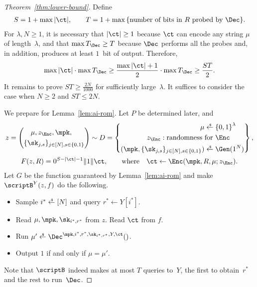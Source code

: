 \begin{proof}
[%
Theorem~\ref{thm:lower-bound}]
Define
\begin{align*}
S=1+\max{|\ct|},\qquad
T=1+\max{\{\textup{number of bits in $R$ probed by $\Dec$}\}}.
\end{align*}
For ${\lambda,N\geq 1}$, it is necessary
that ${|\ct|\geq 1}$ because $\ct$ can encode any string $\mu$ of length~$\lambda$, and
that ${\max{T_\Dec}\geq T}$ because $\Dec$ performs all the probes and, in addition, produces at least $1$~bit of output.
Therefore,
\begin{align*}
\max{|\ct|}\cdot\max{T_\Dec}
\geq\frac{\max{|\ct|}+1}{2}\cdot\max{T_\Dec}
\geq\frac{ST}{2}.
\end{align*}
It remains to prove ${ST\geq\frac{2N}{1000}}$ for sufficiently large~$\lambda$.
It suffices to consider the case when ${N\geq 2}$ and ${ST\leq 2N}$.

We prepare for Lemma~\ref{lem:ai-rom}.
Let $P$ be determined later, and
\begin{align*}
z&{}=\left(\begin{aligned}
&\quad\WideNarrow{}{\ \,}\mu,z_\Enc,\mpk,\\
&\{\sk_{j,s}\}_{j\in[N],s\in\bit}
\end{aligned}\right)\sim D=
\left\{\begin{aligned}
\mu\draws{}&\bit^\lambda\\
z_\Enc:\textup{randomness for }&\Enc\\
(\mpk,\{\sk_{j,s}\}_{j\in[N],s\in\bit})\draws{}&\Gen(1^N)
\end{aligned}\right\},\\
\rule[1em]{0pt}{0pt}
F(z,R)
\hspace*{-5em}&\hspace*{5em}
{}=0^{S-|\ct|-1}\concat 1\concat\ct,\qquad
\textup{where}\quad
\ct\gets\Enc(\mpk,R,\mu;z_\Enc).
\end{align*}
Let $G$ be the function guaranteed by Lemma~\ref{lem:ai-rom} and make
$\scriptB^Y(z,f)$ do the following.
\begin{itemize}
\item Sample ${i^\ast\draws[N]}$ and query ${r^\ast\gets Y[i^\ast]}$.
\item Read $\mu,\mpk,\sk_{i^\ast,r^\ast}$ from $z$. Read $\ct$ from $f$.
\item Run ${\mu'\draws\Dec^{\mpk,i^\ast,r^\ast,\sk_{i^\ast,r^\ast},Y,\ct}()}$.
\item Output $1$ if and only if ${\mu=\mu'}$.
\end{itemize}
Note that $\scriptB$ indeed makes at most $T$ queries to~$Y$,
the first to obtain~$r^\ast$ and the rest to run~$\Dec$.


\end{proof}
